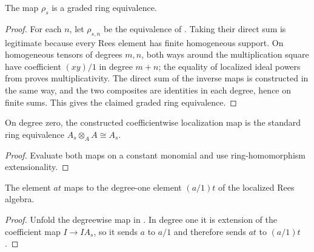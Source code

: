 \begin{proposition}
  \label{prop:nagata-rees-localization}

  The map $\rho_s$ is a graded ring equivalence.
\end{proposition}

\begin{proof}
  For each $n$, let $\rho_{s,n}$ be the equivalence of
  .  Taking their direct sum is
  legitimate because every Rees element has finite homogeneous support.  On
  homogeneous tensors of degrees $m,n$, both ways around the multiplication
  square have coefficient $(xy)/1$ in degree $m+n$; the equality of localized
  ideal powers from  proves
  multiplicativity.  The direct sum of the inverse maps is constructed in
  the same way, and the two composites are identities in each degree, hence
  on finite sums.  This gives the claimed graded ring equivalence.
\end{proof}

\begin{lemma}
  \label{lemma:nagata-rees-localization-degree-zero}

  On degree zero, the constructed coefficientwise localization map is the standard ring
  equivalence $A_s\otimes_AA\cong A_s$.
\end{lemma}

\begin{proof}
  Evaluate both maps on a constant monomial and use ring-homomorphism
  extensionality.
\end{proof}

\begin{lemma}
  \label{lemma:nagata-rees-localization-degree-one}

  The element $at$ maps to the degree-one element $(a/1)t$ of the localized
  Rees algebra.
\end{lemma}

\begin{proof}
  Unfold the degreewise map in
  .  In degree one it is extension of the
  coefficient map $I\to IA_s$, so it sends $a$ to $a/1$ and therefore sends
  $at$ to $(a/1)t$.
\end{proof}

